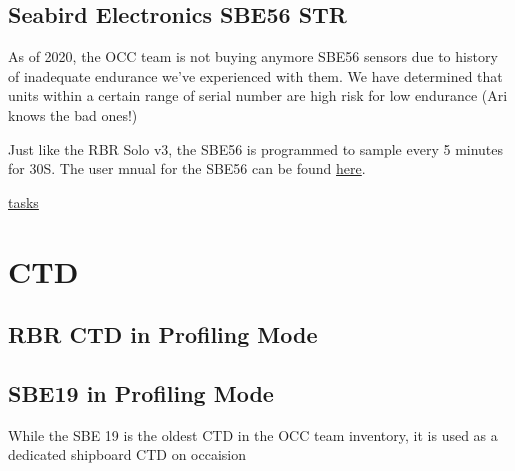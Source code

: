 \documentclass[]{book}
\begin{document}
\hypertarget{sbe56}{\section{Seabird Electronics SBE56
STR}\label{sbe56}}

As of 2020, the OCC team is not buying anymore SBE56 sensors due to
history of inadequate endurance we've experienced with them. We have
determined that units within a certain range of serial number are high
risk for low endurance (Ari knows the bad ones!)

Just like the RBR Solo v3, the SBE56 is programmed to sample every 5
minutes for 30S. The user mnual for the SBE56 can be found
\href{https://drive.google.com/drive/folders/1ujFmH1pJ704ikrsc11Ji2eNeuIBQ5JMa}{here}.

\protect\hyperlink{tasks}{tasks}

\chapter{CTD}\label{ctd}

\section{RBR CTD in Profiling Mode}\label{rbr-ctd-in-profiling-mode}

\section{SBE19 in Profiling Mode}\label{sbe19-in-profiling-mode}

While the SBE 19 is the oldest CTD in the OCC team inventory, it is used
as a dedicated shipboard CTD on occaision
\end{document}
